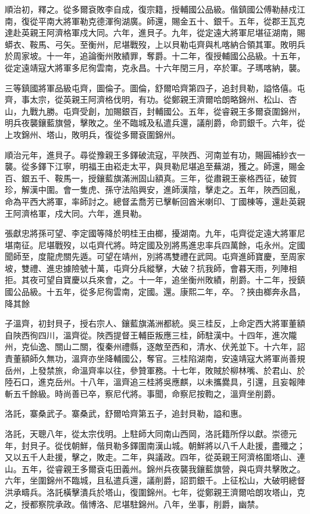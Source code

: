\begin{pinyinscope}
順治初，釋之。從多爾袞敗李自成，復宗籍，授輔國公品級。偕鎮國公傅勒赫戍江南，復從平南大將軍勒克德渾徇湖廣。師還，賜金五十、銀千。五年，從郡王瓦克達赴英親王阿濟格軍戍大同。六年，進貝子。九年，從定遠大將軍尼堪征湖南，賜蟒衣、鞍馬、弓矢。至衡州，尼堪戰歿，上以貝勒屯齊與札喀納合領其軍。敗明兵於周家坡。十一年，追論衡州敗績罪，奪爵。十二年，復授輔國公品級。十五年，從定遠靖寇大將軍多尼徇雲南，克永昌。十六年閏三月，卒於軍。子瑪喀納，襲。

三等鎮國將軍品級屯齊，圖倫子。圖倫，舒爾哈齊第四子，追封貝勒，謚恪僖。屯齊，事太宗，從英親王阿濟格伐明，有功。從鄭親王濟爾哈朗略錦州、松山、杏山，九戰九勝。屯齊受創，加賜銀百，封輔國公。五年，從睿親王多爾袞圍錦州，明兵夜襲鑲藍旗營，擊敗之。坐不臨城及私遣兵還，議削爵，命罰銀千。六年，從上攻錦州、塔山，敗明兵，復從多爾袞圍錦州。

順治元年，進貝子。尋從豫親王多鐸破流寇，平陜西、河南並有功，賜圓補紗衣一襲。從多鐸下江寧，明福王由崧走太平，與貝勒尼堪追至蕪湖，獲之。師還，賜金百、銀五千、鞍馬一，授鑲藍旗滿洲固山額真。三年，從肅親王豪格西征，破賀珍，解漢中圍。會一隻虎、孫守法陷興安，進師漢陰，擊走之。五年，陜西回亂，命為平西大將軍，率師討之。總督孟喬芳已擊斬回酋米喇印、丁國棟等，還赴英親王阿濟格軍，戍大同。六年，進貝勒。

張獻忠將孫可望、李定國等降於明桂王由榔，擾湖南。九年，屯齊從定遠大將軍尼堪南征。尼堪戰歿，以屯齊代將。時定國及別將馬進忠率兵四萬餘，屯永州。定國聞師至，度龍虎關先遁。可望在靖州，別將馮雙禮在武岡。屯齊進師寶慶，至周家坡，雙禮、進忠據險號十萬，屯齊分兵縱擊，大破？抗我師，會暮天雨，列陣相拒。其夜可望自寶慶以兵來會，之。十一年，追坐衡州敗績，削爵。十二年，授鎮國公品級。十五年，從多尼徇雲南，定國。還。康熙二年，卒。？挾由榔奔永昌，降其餘

子溫齊，初封貝子，授右宗人、鑲藍旗滿洲都統。吳三桂反，上命定西大將軍董額自陜西徇四川，溫齊從。陜西提督王輔臣叛應三桂，師駐漢中。十四年，進次隴州，克仙逸、關山二關，復秦州禮縣，逐敵至西和，清水、伏羌並下。十六年，詔責董額師久無功，溫齊亦坐降輔國公，奪官。三桂陷湖南，安遠靖寇大將軍尚善規岳州，上發禁旅，命溫齊率以往，參贊軍務。十七年，敗賊於柳林嘴、於君山、於陸石口，進克岳州。十八年，溫齊追三桂將吳應麒，以未攜爨具，引還，且妄報陣斬五千餘級。時尚善已卒，察尼代將。事聞，命察尼按鞫之，溫齊坐削爵。

洛託，寨桑武子。寨桑武，舒爾哈齊第五子，追封貝勒，謚和惠。

洛託，天聰八年，從太宗伐明。上駐師大同南山西岡，洛託籍所俘以獻。崇德元年，封貝子。從伐朝鮮，偕貝勒多鐸圍南漢山城。朝鮮將以八千人赴援，盡殲之；又以五千人赴援，擊之，敗走。二年，與議政。四年，從英親王阿濟格圍塔山、連山。五年，從睿親王多爾袞屯田義州。錦州兵夜襲我鑲藍旗營，與屯齊共擊敗之。六年，坐圍錦州不臨城，且私遣兵還，議削爵，詔罰銀千。上征松山，大破明總督洪承疇兵。洛託橫擊潰兵於塔山，復圍錦州。七年，從鄭親王濟爾哈朗攻塔山，克之，授都察院承政。偕博洛、尼堪駐錦州。八年，坐事，削爵，幽禁。


\end{pinyinscope}

